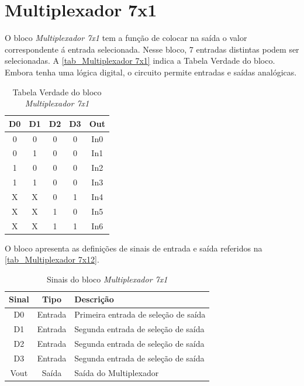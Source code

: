 \renewcommand{\NomeBloco}{\emph{Multiplexador 7x1}}
\renewcommand{\NomeBlocoNoIt}{Multiplexador 7x1}
\renewcommand{\NomePTab}{tab_\NomeBlocoNoIt}
\renewcommand{\NomeSTab}{tab_\NomeBlocoNoIt2}
\renewcommand{\NomePFig}{fig_\NomeBlocoNoIt}
\renewcommand{\NomeSFig}{fig_\NomeBlocoNoIt2}
\renewcommand{\NomeTTab}{tab_\NomeBlocoNoIt3}

\section{Multiplexador 7x1}

O bloco \NomeBloco{} tem a função de colocar na sa\'ida o valor correspondente \'a entrada selecionada. Nesse bloco, 7 entradas distintas podem ser selecionadas. A \autoref{\NomePTab} indica a Tabela Verdade do bloco. Embora tenha uma l\'ogica digital, o circuito permite entradas e sa\'idas anal\'ogicas.

\begin{table}[htbp]

\caption{Tabela Verdade do bloco \NomeBloco}%
\label{\NomePTab}
\centering
\begin{tabular}{ccccc}
    \toprule
    D0 & D1 & D2 & D3 & Out \\
    \midrule \midrule
    0 & 0 & 0 & 0 & In0 \\
    \midrule
    0 & 1 & 0 & 0 & In1 \\
    \midrule
    1 & 0 & 0 & 0 & In2 \\
    \midrule
    1 & 1 & 0 & 0 & In3 \\
    \midrule
    X & X & 0 & 1 & In4 \\
    \midrule
    X & X & 1 & 0 & In5 \\
    \midrule
    X & X & 1 & 1 & In6 \\
\bottomrule

\end{tabular}
\end{table}

O bloco apresenta as definições de sinais de entrada e sa\'ida referidos na \autoref{\NomeSTab}.

\begin{table}[htbp]
\caption{Sinais do bloco \NomeBloco}
\label{\NomeSTab}
\centering
\begin{tabular}{ccl}

    \toprule
    Sinal & Tipo    & Descrição        \\
    \midrule \midrule
    D0    & Entrada & Primeira entrada de seleção de sa\'ida \\
    \midrule
    D1    & Entrada & Segunda entrada de seleção de sa\'ida \\
    \midrule
    D2    & Entrada & Segunda entrada de seleção de sa\'ida \\
    \midrule
    D3    & Entrada & Segunda entrada de seleção de sa\'ida \\
    \midrule
    Vout & Sa\'ida & Sa\'ida do Multiplexador\\
    \midrule
    \bottomrule
\end{tabular}
\end{table}

